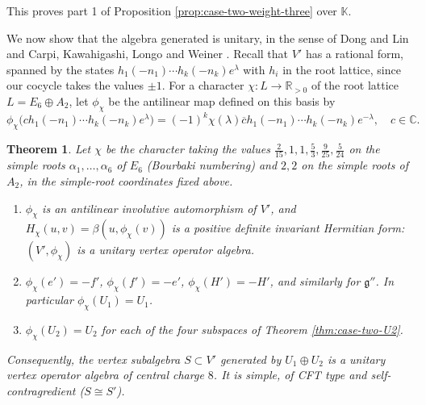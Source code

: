 \documentclass[leqno]{article}
\newcommand{\Cbb}{\ensuremath{\mathbb{C}}}
\newcommand{\K}{\ensuremath{\mathbb{K}}}
\newcommand{\R}{\ensuremath{\mathbb{R}}}
\newcommand{\co}{\colon}
\newtheorem{thm}{Theorem}[section]
\numberwithin{equation}{section}
\begin{document}
This proves part 1 of Proposition \ref{prop:case-two-weight-three} over $\K$.

We now show that the algebra generated is unitary, in the sense of Dong and Lin \cite{DoL14} and Carpi, Kawahigashi, Longo and Weiner \cite[Section 5]{CKLW18}. Recall that $V'$ has a rational form, spanned by the states $h_1(-n_1)\cdots h_k(-n_k)e^\lambda$ with $h_i$ in the root lattice, since our cocycle takes the values $\pm 1$. For a character $\chi \co L \to \R_{>0}$ of the root lattice $L = E_6 \oplus A_2$, let $\phi_\chi$ be the antilinear map defined on this basis by
\begin{equation}
\label{eq:phi-chi}
\phi_\chi\big(c  h_1(-n_1)\cdots h_k(-n_k)e^\lambda\big) = (-1)^k  \chi(\lambda)  \overline{c}  h_1(-n_1)\cdots h_k(-n_k)e^{-\lambda}, \quad c \in \Cbb.
\end{equation}

\begin{thm}
\label{thm:unitarity}
Let $\chi$ be the character taking the values $\frac{2}{15}, 1, 1, \frac53, \frac{9}{25}, \frac{5}{24}$ on the simple roots $\alpha_1, \ldots, \alpha_6$ of $E_6$ (Bourbaki numbering) and $2, 2$ on the simple roots of $A_2$, in the simple-root coordinates fixed above.
\begin{enumerate}
\item $\phi_\chi$ is an antilinear involutive automorphism of $V'$, and $H_\chi(u,v) = \beta(u,\phi_\chi(v))$ is a positive definite invariant Hermitian form: $(V',\phi_\chi)$ is a unitary vertex operator algebra.
\item $\phi_\chi(e') = -f'$, $\phi_\chi(f') = -e'$, $\phi_\chi(H') = -H'$, and similarly for $\mathfrak g''$. In particular $\phi_\chi(U_1) = U_1$.
\item $\phi_\chi(U_2) = U_2$ for each of the four subspaces of Theorem \ref{thm:case-two-U2}.
\end{enumerate}
Consequently, the vertex subalgebra $S \subset V'$ generated by $U_1 \oplus U_2$ is a unitary vertex operator algebra of central charge $8$. It is simple, of CFT type and self-contragredient ($S \cong S'$).
\end{thm}
\end{document}
